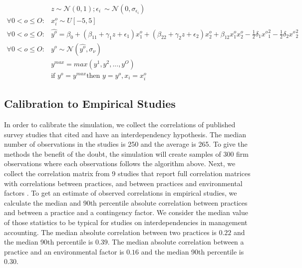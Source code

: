 \documentclass[12pt]{article}
\begin{document}
\begin{equation}\label{eq:firm-simulation}
\begin{aligned}
	&z \sim \mathcal{N}(0, 1); \epsilon_i ~ \sim \mathcal{N}(0, \sigma_{\epsilon_i}) \\
    \forall 0 < o \leq O: &x^o_i \sim U[-5,5] \\
    \forall 0 < o \leq O: &\hat{y^o} = \beta_0 + (\beta_{11} + \gamma_1 z + \epsilon_1) x^o_1 
						+ (\beta_{22} + \gamma_2 z  + \epsilon_2) x^o_2 
                        + \beta_{12} x^o_1 x^o_2 - \frac{1}{2}\delta_1 {x^o}^2_1 - \frac{1}{2}\delta_2 {x^o}^2_2 \\
     \forall 0 < o \leq O: &y^o \sim \mathcal{N}(\hat{y^o}, \sigma_{\nu}) \\
	 &y^{max} = max(y^1, y^2, ..., y^O)  \\
     &\text{if } y^o = y^{max} \text{then } y = y^o, x_i = x^o_i
\end{aligned}
\end{equation}

\subsection{Calibration to Empirical Studies}\label{optimality}

In order to calibrate the simulation, we collect the correlations of published survey studies that cited \citet{grabner_management_2013} and have an interdependency hypothesis. The median number of observations in the studies is 250 and the average is 265. To give the methods the benefit of the doubt, the simulation will create samples of 300 firm observations where each observations follows the algorithm above. Next, we collect the correlation matrix from 9 studies that report full correlation matrices with correlations between practices, and between practices and environmental factors \citep{dekker_collaborative_2016, grabner_incentive_2014, grabner_cost_2016, bedford_configurations_2015, heinicke_examination_2016, bedford_performance_2019, abernethy_are_2015, sponem_exploring_2016, samagaio_management_2018}. To get an estimate of observed correlations in empirical studies, we calculate the median and 90th percentile absolute correlation between practices and between a practice and a contingency factor. We consider the median value of those statistics to be typical for studies on interdependencies in management accounting. The median absolute correlation between two practices is $0.22$ and the median 90th percentile is $0.39$. The median absolute correlation between a practice and an environmental factor is $0.16$ and the median 90th percentile is $0.30$.
\end{document}
